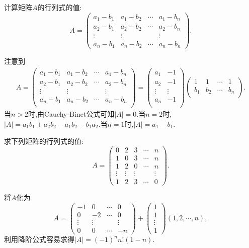 \documentclass[lang=cn,newtx,10pt,scheme=chinese]{elegantbook}
\begin{document}
\begin{example}
计算矩阵\(A\)的行列式的值:
\[
A = 
\begin{pmatrix}
a_1 - b_1 & a_1 - b_2 & \cdots & a_1 - b_n\\
a_2 - b_1 & a_2 - b_2 & \cdots & a_2 - b_n\\
\vdots & \vdots & & \vdots\\
a_n - b_1 & a_n - b_2 & \cdots & a_n - b_n
\end{pmatrix}.
\]
\end{example}
\begin{solution}
注意到\begin{align*}
A=\left( \begin{matrix}
a_1-b_1&		a_1-b_2&		\cdots&		a_1-b_n\\
a_2-b_1&		a_2-b_2&		\cdots&		a_2-b_n\\
\vdots&		\vdots&		&		\vdots\\
a_n-b_1&		a_n-b_2&		\cdots&		a_n-b_n\\
\end{matrix} \right) =\left( \begin{matrix}
a_1&		-1\\
a_2&		-1\\
\vdots&		\vdots\\
a_n&		-1\\
\end{matrix} \right) \left( \begin{matrix}
1&		1&		\cdots&		1\\
b_1&		b_2&		\cdots&		b_n\\
\end{matrix} \right) .
\end{align*}
当$n>2$时,由Cauchy-Binet公式可知$\left| A \right|=0$.当$n=2$时,$\left| A \right|=a_1b_1+a_2b_2-a_1b_2-b_1a_2$.当$n=1$时,$\left| A \right|=a_1-b_1$.
\end{solution}

\begin{example}
求下列矩阵的行列式的值:
\[
A = 
\begin{pmatrix}
0 & 2 & 3 & \cdots & n\\
1 & 0 & 3 & \cdots & n\\
1 & 2 & 0 & \cdots & n\\
\vdots & \vdots & \vdots & & \vdots\\
1 & 2 & 3 & \cdots & 0
\end{pmatrix}.
\]
\end{example}
\begin{solution}
将\(A\)化为
\[
A = 
\begin{pmatrix}
-1 & 0 & \cdots & 0\\
0 & -2 & \cdots & 0\\
\vdots & \vdots & & \vdots\\
0 & 0 & \cdots & -n
\end{pmatrix}
+
\begin{pmatrix}
1\\
1\\
\vdots\\
1
\end{pmatrix}
(1,2,\cdots,n),
\]
利用降阶公式容易求得\(|A| = (-1)^nn!(1 - n)\).
\end{solution}
\end{document}
